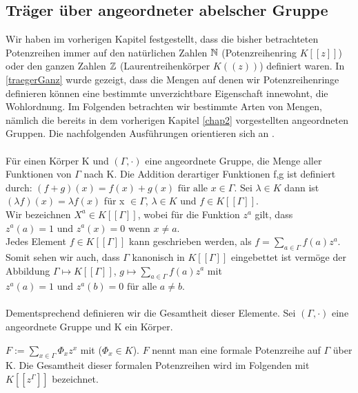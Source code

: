 \subsection{Träger über angeordneter abelscher Gruppe}
Wir haben im vorherigen Kapitel festgestellt, dass die bisher betrachteten Potenzreihen immer auf den natürlichen Zahlen $\mathbb{N}$ (Potenzreihenring $K[[z]]$) oder den ganzen Zahlen $\mathbb{Z}$ (Laurentreihenkörper $K((z))$) definiert waren. In \ref{traegerGanz} wurde gezeigt, dass die Mengen auf denen wir Potenzreihenringe definieren können eine bestimmte unverzichtbare Eigenschaft innewohnt, die Wohlordnung. Im Folgenden betrachten wir bestimmte Arten von Mengen, nämlich die bereits in dem vorherigen Kapitel \ref{chap2} vorgestellten angeordneten Gruppen. Die nachfolgenden Ausführungen orientieren sich an \cite{fuchs66}.\\\\
Für einen Körper K und $\left(\Gamma, \cdot \right)$ eine angeordnete Gruppe, die Menge aller Funktionen von $\Gamma$ nach K. Die Addition derartiger Funktionen f,g ist definiert durch: $\left(f + g\right)(x) = f(x) + g(x) \text{ für alle } x \in \Gamma$. Sei $\lambda \in K$ dann ist  $\left(\lambda f\right)(x) = \lambda f(x)$ für x $\in \Gamma$, $\lambda \in K$ und $f \in K[[\Gamma]].$ \\
Wir bezeichnen $X^a \in K[[\Gamma]]$, wobei für die Funktion $z^a$ gilt, dass $z^a(a) = 1 \text{ und } z^a(x) = 0 \text{ wenn } x \neq a$. \\
Jedes Element $f \in K[[\Gamma]]$ kann geschrieben werden, als $ f= \sum_{a \in \Gamma}^{}f(a)z^a.$ 
Somit sehen wir auch, dass $\Gamma$ kanonisch in $K[[\Gamma]]$ eingebettet ist vermöge der Abbildung $\Gamma \mapsto K[[\Gamma]]$, $g \longmapsto \sum_{a \in \Gamma}^{} f(a)z^a$ mit $z^a(a) = 1 \text{ und } z^a(b) = 0 \text{ für alle } a \neq b$. \\
\vspace{0.5cm}\\
%
Dementsprechend definieren wir die Gesamtheit dieser Elemente. Sei $\left( \Gamma, \cdot \right)$ eine angeordnete Gruppe und K ein Körper.
\begin{defn}\label{formaleSumme}
$F := \sum_{x \in \Gamma}^{}\Phi_x z^x$ mit ($\Phi_x \in K$). $F$ nennt man eine formale Potenzreihe auf $\Gamma$ über K. Die Gesamtheit dieser formalen Potenzreihen wird im Folgenden mit $K[[z^{\Gamma}]]$ bezeichnet.
\end{defn}

